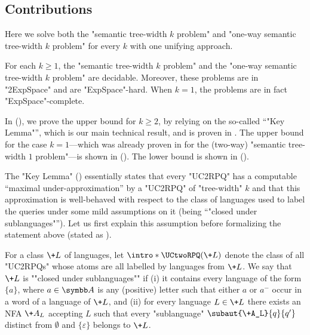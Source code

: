 \subsection{Contributions}
Here we solve both the "semantic tree-width $k$ problem" and "one-way semantic tree-width $k$ problem" for every $k$ with one unifying approach.
\begin{theorem}
    \AP\label{thm:decidability-semtw}
    For each $k \geq 1$, the "semantic tree-width $k$ problem" and the "one-way semantic tree-width $k$ problem" are decidable. Moreover, these problems are in "2ExpSpace" and are "ExpSpace"-hard.
	When $k=1$, the problems are in fact "ExpSpace"-complete.
\end{theorem}
In  (),
we prove the upper bound for $k\geq 2$, by relying on the so-called ``"Key Lemma"'', which is our main technical result, and is proven in .
The upper bound for the case $k=1$---which was already proven in \cite{BarceloRomeroVardi2016SemanticAcyclicity} for the (two-way) "semantic tree-width $1$ problem"---is shown in  (). The lower bound is shown in  ().

The "Key Lemma" () essentially states that
every "UC2RPQ" has a computable ``maximal under-approximation'' by a "UC2RPQ" of "tree-width" $k$ and that this approximation is well-behaved with respect to the class of languages used to label the queries under some mild assumptions on it (being ``"closed under sublanguages"''). Let us first
explain this assumption before formalizing the statement above (stated as ).

For a class $\+L$ of languages, let $\intro*\UCtwoRPQ(\+L)$ denote the class of all "UC2RPQs" whose atoms are all labelled by languages from $\+L$.
\AP We say that $\+L$ is ""closed under sublanguages"" if
(i) it contains every language of the form $\{a\}$,
where $a \in \A$ is any (positive) letter such that either $a$ or $a^-$ occur in a word of a
language of $\+L$, and (ii) for every language $L \in \+L$ there exists an NFA $\+A_L$ accepting $L$ such that every "sublanguage" $\subaut{\+A_L}{q}{q'}$ distinct from $\emptyset$ and
$\{\varepsilon\}$ belongs to $\+L$.

